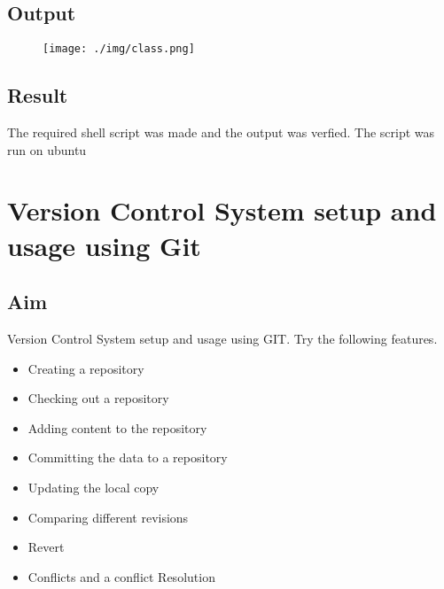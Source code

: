 \documentclass{article}
\begin{document}
\subsection{Output}
\begin{figure}[h!]
	\texttt{[image: ./img/class.png]}
\end{figure}


\subsection{Result}
The required shell script was made and the output was verfied. The script was run on ubuntu

\begin{refsection}
\cite{shellbible}
\cite{shellbook}
\printbibliography
\end{refsection}

\newpage

\section{Version Control System setup and usage using Git}

\subsection{Aim}
Version Control System setup and usage using GIT. Try the following features.
\begin{itemize}
\item Creating a repository
\item Checking out a repository
\item Adding content to the repository
\item Committing the data to a repository
\item Updating the local copy
\item Comparing different revisions
\item Revert
\item Conflicts and a conflict Resolution
\end{itemize}
\end{document}
